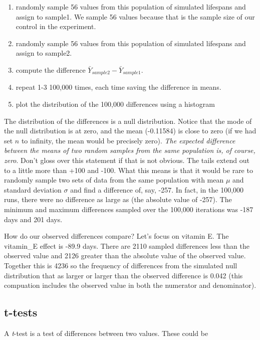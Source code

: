 \documentclass[]{book}
\providecommand{\tightlist}{%
  \setlength{\itemsep}{0pt}\setlength{\parskip}{0pt}}
\begin{document}
\begin{enumerate}
\def\labelenumi{\arabic{enumi}.}
\tightlist
\item
  randomly sample 56 values from this population of simulated lifespans and assign to sample1. We sample 56 values because that is the sample size of our control in the experiment.
\item
  randomly sample 56 values from this population of simulated lifespans and assign to sample2.
\item
  compute the difference \(\bar{Y}_{sample2} - \bar{Y}_{sample1}\).
\item
  repeat 1-3 100,000 times, each time saving the difference in means.
\item
  plot the distribution of the 100,000 differences using a histogram
\end{enumerate}

The distribution of the differences is a null distribution. Notice that the mode of the null distribution is at zero, and the mean (-0.11584) is close to zero (if we had set \(n\) to infinity, the mean would be precisely zero). \emph{The expected difference between the means of two random samples from the same population is, of course, zero}. Don't gloss over this statement if that is not obvious. The tails extend out to a little more than +100 and -100. What this means is that it would be rare to randomly sample two sets of data from the same population with mean \(\mu\) and standard deviation \(\sigma\) and find a difference of, say, -257. In fact, in the 100,000 runs, there were no difference as large as \textbar{} (the absolute value of -257). The minimum and maximum differences sampled over the 100,000 iterations was -187 days and 201 days.

How do our observed differences compare? Let's focus on vitamin E. The vitamin\_E effect is -89.9 days. There are 2110 sampled differences less than the observed value and 2126 greater than the absolute value of the observed value. Together this is 4236 so the frequency of differences from the simulated null distribution that as larger or larger than the observed difference is 0.042 (this compuation includes the observed value in both the numerator and denominator).

\hypertarget{t-tests}{%
\subsection{t-tests}\label{t-tests}}

A \emph{t}-test is a test of differences between two values. These could be
\end{document}
